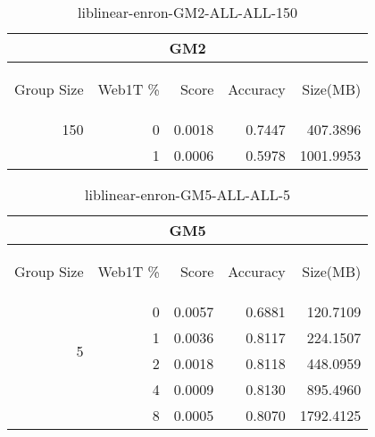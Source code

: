 \begin{center}
\begin{table}[htbp]
\begin{tabular}{ | r | r | r | r | r |}
\hline
\multicolumn{5}{|c|}{GM2}\\
\hline
\begin{sideways}Group Size\end{sideways} & \begin{sideways}Web1T \%\end{sideways} & \begin{sideways}Score\end{sideways} & \begin{sideways}Accuracy\end{sideways} & \begin{sideways}Size(MB)\end{sideways}\\
\hline
\multirow{1}{*}{150}
 & 0 & 0.0018 & 0.7447 & 407.3896\\ \cline{2-5}
 & 1 & 0.0006 & 0.5978 & 1001.9953\\ \cline{2-5}
\hline
\end{tabular}
\caption{liblinear-enron-GM2-ALL-ALL-150}
\label{table:liblinear-enron-GM2-ALL-ALL-150}
\end{table}
\end{center}

\begin{center}
\begin{table}[htbp]
\begin{tabular}{ | r | r | r | r | r |}
\hline
\multicolumn{5}{|c|}{GM5}\\
\hline
\begin{sideways}Group Size\end{sideways} & \begin{sideways}Web1T \%\end{sideways} & \begin{sideways}Score\end{sideways} & \begin{sideways}Accuracy\end{sideways} & \begin{sideways}Size(MB)\end{sideways}\\
\hline
\multirow{4}{*}{5}
 & 0 & 0.0057 & 0.6881 & 120.7109\\ \cline{2-5}
 & 1 & 0.0036 & 0.8117 & 224.1507\\ \cline{2-5}
 & 2 & 0.0018 & 0.8118 & 448.0959\\ \cline{2-5}
 & 4 & 0.0009 & 0.8130 & 895.4960\\ \cline{2-5}
 & 8 & 0.0005 & 0.8070 & 1792.4125\\ \cline{2-5}
\hline
\end{tabular}
\caption{liblinear-enron-GM5-ALL-ALL-5}
\label{table:liblinear-enron-GM5-ALL-ALL-5}
\end{table}
\end{center}

